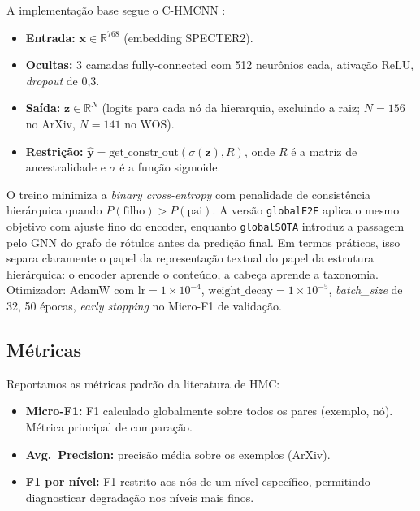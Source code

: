 \documentclass[11pt,a4paper,twoside]{article}
\begin{document}
A implementação base segue o \textsc{C-HMCNN} \cite{giunchiglia2020coherent}:

\begin{itemize}[leftmargin=*, itemsep=2pt]
  \item \textbf{Entrada:} $\mathbf{x} \in \mathbb{R}^{768}$ (embedding SPECTER2).
  \item \textbf{Ocultas:} 3 camadas fully-connected com 512 neurônios cada,
        ativação ReLU, \textit{dropout} de 0,3.
  \item \textbf{Saída:} $\mathbf{z} \in \mathbb{R}^{N}$ (logits para cada nó da
        hierarquia, excluindo a raiz; $N=156$ no ArXiv, $N=141$ no WOS).
  \item \textbf{Restrição:} $\hat{\mathbf{y}} = \text{get\_constr\_out}(\sigma(\mathbf{z}), R)$,
        onde $R$ é a matriz de ancestralidade e $\sigma$ é a função sigmoide.
\end{itemize}

O treino minimiza a \textit{binary cross-entropy} com penalidade de consistência
hierárquica quando $P(\text{filho}) > P(\text{pai})$. A versão \texttt{globalE2E}
aplica o mesmo objetivo com ajuste fino do encoder, enquanto \texttt{globalSOTA}
introduz a passagem pelo GNN do grafo de rótulos antes da predição final. Em
termos práticos, isso separa claramente o papel da representação textual do
papel da estrutura hierárquica: o encoder aprende o conteúdo, a cabeça aprende
a taxonomia. Otimizador: AdamW com $\text{lr} = 1\times10^{-4}$,
$\text{weight\_decay} = 1\times10^{-5}$, \textit{batch\_size} de 32, 50 épocas,
\textit{early stopping} no Micro-F1 de validação.

\subsection{Métricas}

Reportamos as métricas padrão da literatura de HMC:

\begin{itemize}[leftmargin=*, itemsep=1pt]
  \item \textbf{Micro-F1:} F1 calculado globalmente sobre todos os pares
        (exemplo, nó). Métrica principal de comparação.
  \item \textbf{Avg.\ Precision:} precisão média sobre os exemplos (ArXiv).
  \item \textbf{F1 por nível:} F1 restrito aos nós de um nível específico,
        permitindo diagnosticar degradação nos níveis mais finos.
\end{itemize}
\end{document}
